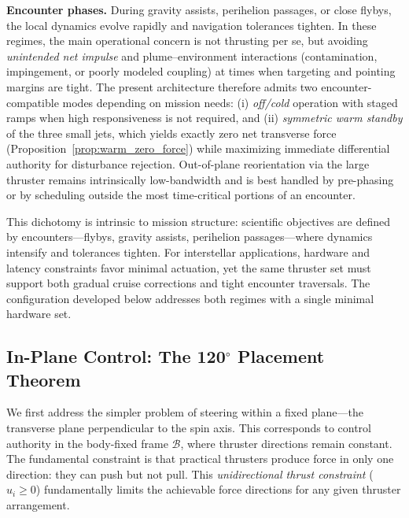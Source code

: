 \documentclass{article}
\begin{document}
\textbf{Encounter phases.} During gravity assists, perihelion passages, or close flybys, the local dynamics evolve rapidly and navigation tolerances tighten. In these regimes, the main operational concern is not thrusting per se, but avoiding \emph{unintended net impulse} and plume--environment interactions (contamination, impingement, or poorly modeled coupling) at times when targeting and pointing margins are tight. The present architecture therefore admits two encounter-compatible modes depending on mission needs: (i) \emph{off/cold} operation with staged ramps when high responsiveness is not required, and (ii) \emph{symmetric warm standby} of the three small jets, which yields exactly zero net transverse force (Proposition~\ref{prop:warm_zero_force}) while maximizing immediate differential authority for disturbance rejection. Out-of-plane reorientation via the large thruster remains intrinsically low-bandwidth and is best handled by pre-phasing or by scheduling outside the most time-critical portions of an encounter.

This dichotomy is intrinsic to mission structure: scientific objectives are defined by encounters---flybys, gravity assists, perihelion passages---where dynamics intensify and tolerances tighten. For interstellar applications, hardware and latency constraints favor minimal actuation, yet the same thruster set must support both gradual cruise corrections and tight encounter traversals. The configuration developed below addresses both regimes with a single minimal hardware set.

\subsection{In-Plane Control: The 120$^\circ$ Placement Theorem}
\label{sec:120_theorem}

We first address the simpler problem of steering within a fixed plane---the transverse plane perpendicular to the spin axis. This corresponds to control authority in the body-fixed frame $\mathcal{B}$, where thruster directions remain constant. The fundamental constraint is that practical thrusters produce force in only one direction: they can push but not pull. This \emph{unidirectional thrust constraint} ($u_i \geq 0$) fundamentally limits the achievable force directions for any given thruster arrangement.
\end{document}
